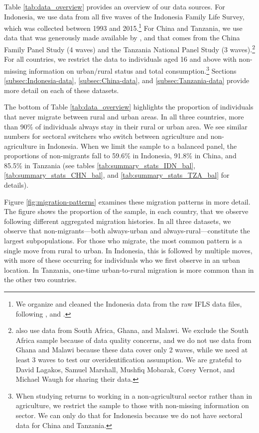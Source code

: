 \documentclass[12pt]{article}
\begin{document}
Table \ref{tab:data_overview} provides an overview of our data sources. For Indonesia, we use data from all five waves of the Indonesia Family Life Survey, which was collected between 1993 and 2015.\footnote{We organize and cleaned the Indonesia data from the raw IFLS data files, following \cite{kleemansLabourMarketResponses2018}, \cite{hamoryReevaluatingAgriculturalProductivity2021} and \cite{kleemansMigrationChoiceRisk}.} For China and Tanzania, we use data that was generously made available by \cite{lagakosMigrationCostsObservational2020}, and that comes from the China Family Panel Study (4 waves) and the Tanzania National Panel Study (3 waves).\footnote{\cite{lagakosMigrationCostsObservational2020} also use data from South Africa, Ghana, and Malawi. We exclude the South Africa sample because of data quality concerns, and we do not use data from Ghana and Malawi because these data cover only 2 waves, while we need at least 3 waves to test our overidentification assumption. We are grateful to David Lagakos, Samuel Marshall, Mushfiq Mobarak, Corey Vernot, and Michael Waugh for sharing their data.}
For all countries, we restrict the data to individuals aged 16 and above with non-missing information on urban/rural status and total consumption.\footnote{When studying returns to working in a non-agricultural sector rather than in agriculture, we restrict the sample to those with non-missing information on sector. We can only do that for Indonesia because we do not have sectoral data for China and Tanzania.} Sections \ref{subsec:Indonesia-data}, \ref{subsec:China-data}, and \ref{subsec:Tanzania-data} provide more detail on each of these datasets. 

The bottom of Table \ref{tab:data_overview} highlights the proportion of individuals that never migrate between rural and urban areas. In all three countries, more than 90\% of individuals always stay in their rural or urban area.
We see similar numbers for sectoral switchers who switch between agriculture and non-agriculture in Indonesia.
When we limit the sample to a balanced panel, the proportions of non-migrants fall to 59.6\% in Indonesia, 91.8\% in China, and 85.5\% in Tanzania (see tables \ref{tab:summary_stats_IDN_bal}, \ref{tab:summary_stats_CHN_bal}, and \ref{tab:summary_stats_TZA_bal} for details). 

Figure \ref{fig:migration-patterns} examines these migration patterns in more detail.
The figure shows the proportion of the sample, in each country, that we observe following different aggregated migration histories.
In all three datasets, we observe that non-migrants---both always-urban and always-rural---constitute the largest subpopulations.
For those who migrate, the most common pattern is a single move from rural to urban. 
In Indonesia, this is followed by multiple moves, with more of these occurring for individuals who we first observe in an urban location.
In Tanzania, one-time urban-to-rural migration is more common than in the other two countries.
\end{document}

